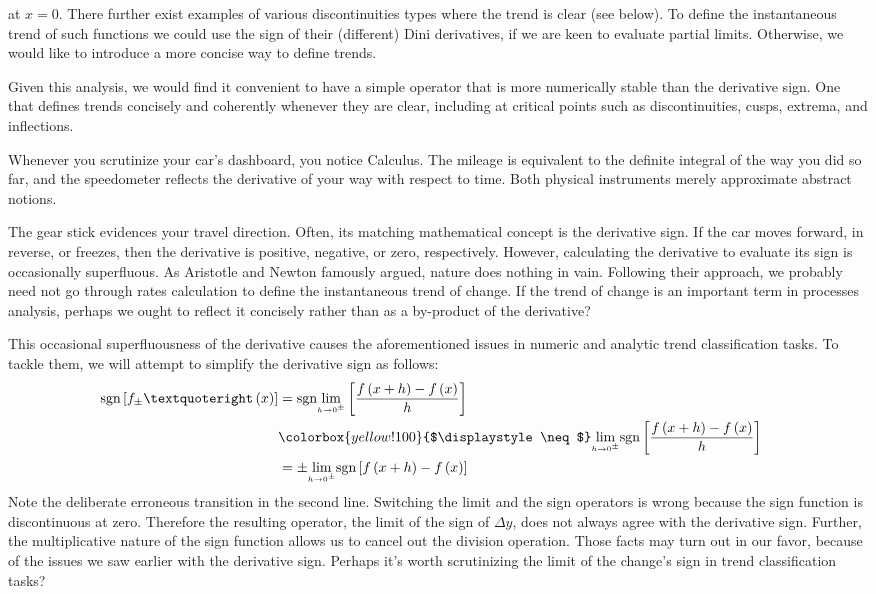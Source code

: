 \documentclass[11pt]{book}
\newcommand{\highlight}[1]{%
  \colorbox{yellow!100}{$\displaystyle#1$}}
\begin{document}
at $x=0$.
There further exist examples of various discontinuities types where the trend is clear (see below). To define the instantaneous trend of such functions we could use the sign of their (different) Dini derivatives, if we are keen to evaluate partial limits. Otherwise, we would like to introduce a more concise way to define trends.

Given this analysis, we would find it convenient to have a simple operator that is more numerically stable than the derivative sign. One that defines trends concisely and coherently whenever they are clear, including at critical points such as discontinuities, cusps, extrema, and inflections.

Whenever you scrutinize your car's dashboard, you notice Calculus. The mileage is equivalent to the definite integral of the way you did so far, and the speedometer reflects the derivative of your way with respect to time. Both physical instruments merely approximate abstract notions.

The gear stick evidences your travel direction. Often, its matching mathematical concept is the derivative sign. If the car moves forward, in reverse, or freezes, then the derivative is positive, negative, or zero, respectively. However, calculating the derivative to evaluate its sign is occasionally superfluous. As Aristotle and Newton famously argued, nature does nothing in vain. Following their approach, we probably need not go through rates calculation to define the instantaneous trend of change. If the trend of change is an important term in processes analysis, perhaps we ought to reflect it concisely rather than as a by-product of the derivative?

This occasional superfluousness of the derivative causes the aforementioned issues in numeric and analytic trend classification tasks. To tackle them, we will attempt to simplify the derivative sign as follows:
\begin{align}
\index{Detachment}
&\begin{aligned}
\text{sgn}\left[f_{\pm}’\left(x\right)\right] & =\text{sgn}\underset{{\scriptscriptstyle h\rightarrow0^{\pm}}}{\lim}\left[\frac{f\left(x+h\right)-f\left(x\right)}{h}\right]\\
&\highlight{\neq} \underset{{\scriptscriptstyle h\rightarrow0^{\pm}}}{\lim}\text{sgn}\left[\frac{f\left(x+h\right)-f\left(x\right)}{h}\right]\\
&=\pm\underset{{\scriptscriptstyle h\rightarrow0^{\pm}}}{\lim}\text{sgn}\left[f\left(x+h\right)-f\left(x\right)\right]
\end{aligned}
\end{align}
Note the deliberate erroneous transition in the second line. Switching the limit and the sign operators is wrong because the sign function is discontinuous at zero. Therefore the resulting operator, the limit of the sign of $\Delta y$, does not always agree with the derivative sign. Further, the multiplicative nature of the sign function allows us to cancel out the division operation. Those facts may turn out in our favor, because of the issues we saw earlier with the derivative sign. Perhaps it’s worth scrutinizing the limit of the change's sign in trend classification tasks?
\end{document}
